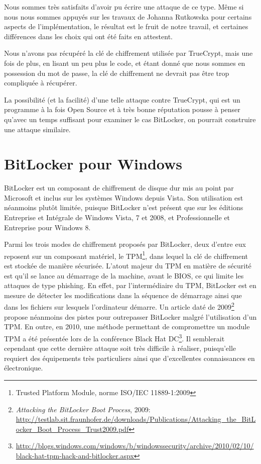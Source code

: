 \documentclass[12pt,a4paper]{article}
\begin{document}
Nous sommes très satisfaits d'avoir pu écrire une attaque de ce type. Même si
nous nous sommes appuyés sur les travaux de Johanna Rutkowska pour certains
aspects de l'implémentation, le résultat est le fruit de notre travail, et
certaines différences dans les choix qui ont été faits en attestent.

Nous n'avons pas récupéré la clé de chiffrement utilisée par TrueCrypt, mais une
fois de plus, en lisant un peu plus le code, et étant donné que nous sommes en 
possession du mot de passe, la clé de chiffrement ne devrait pas être trop 
compliquée à récupérer.

La possibilité (et la facilité) d'une telle attaque contre TrueCrypt, qui est un
programme à la fois Open Source et à très bonne réputation pousse à penser qu'avec
un temps suffisant pour examiner le cas BitLocker, on pourrait construire une
attaque similaire.


\section{BitLocker pour Windows}

BitLocker est un composant de chiffrement de disque dur mis au point par
Microsoft et inclus sur les systèmes Windows depuis Vista. Son utilisation est
néanmoins plutôt limitée, puisque BitLocker n'est présent que sur les éditions
Entreprise et Intégrale de Windows Vista, 7 et 2008, et Professionnelle et
Entreprise pour Windows 8.

Parmi les trois modes de chiffrement proposés par BitLocker, deux d'entre eux
reposent sur un composant matériel, le TPM\footnote{Trusted Platform Module,
norme ISO/IEC 11889-1:2009}, dans lequel la clé de chiffrement est stockée de
manière sécurisée. L'atout majeur du TPM en matière de sécurité est qu'il se
lance au démarrage de la machine, avant le BIOS, ce qui limite les attaques de
type phishing. En effet, par l'intermédiaire du TPM, BitLocker est en mesure de
détecter les modifications dans la séquence de démarrage ainsi que dans les
fichiers sur lesquels l'ordinateur démarre. Un article daté de
2009\footnote{\textit{Attacking the BitLocker Boot Process},
2009:\\\url{http://testlab.sit.fraunhofer.de/downloads/Publications/Attacking_the_BitLocker_Boot_Process_Trust2009.pdf}}
propose néanmoins des pistes pour outrepasser BitLocker malgré l'utilisation
d'un TPM. En outre, en 2010, une méthode permettant de compromettre un module
TPM a été présentée lors de la conférence Black Hat
DC\footnote{\url{http://blogs.windows.com/windows/b/windowssecurity/archive/2010/02/10/black-hat-tpm-hack-and-bitlocker.aspx}}.
Il semblerait cependant que cette dernière attaque soit très difficile à
réaliser, puisqu'elle requiert des équipements très particuliers ainsi que
d'excellentes connaissances en électronique.
\end{document}

